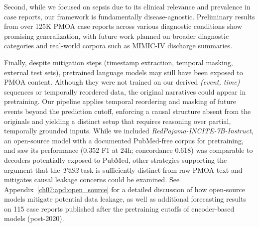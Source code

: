 Second, while we focused on sepsis due to its clinical relevance and prevalence in case reports, our framework is fundamentally disease-agnostic.
Preliminary results from over 125K PMOA case reports across various diagnostic conditions show promising generalization, with future work planned on broader diagnostic categories and real-world corpora such as MIMIC-IV discharge summaries.

Finally, despite mitigation steps (timestamp extraction, temporal masking, external test sets), pretrained language models may still have been exposed to PMOA content.
Although they were not trained on our derived \emph{(event, time)} sequences or temporally reordered data, the original narratives could appear in pretraining.
Our pipeline applies temporal reordering and masking of future events beyond the prediction cutoff, enforcing a causal structure absent from the originals and yielding a distinct setup that requires reasoning over partial, temporally grounded inputs. 
While we included \textit{RedPajama-INCITE-7B-Instruct}, an open-source model with a documented PubMed-free corpus for pretraining, and saw its performance (0.352 F1 at 24h; concordance 0.618) was comparable to decoders potentially exposed to PubMed, other strategies supporting the argument that the \textit{T2S2} task is sufficiently distinct from raw PMOA text and mitigates causal leakage concerns could be examined.
See Appendix~\ref{ch07:apd:open_source} for a detailed discussion of how open-source models mitigate potential data leakage, as well as additional forecasting results on 115 case reports published after the pretraining cutoffs of encoder-based models (post-2020).



